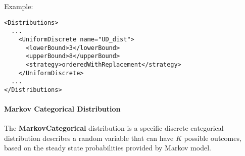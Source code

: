 Example:
\begin{lstlisting}[style=XML]
<Distributions>
  ...
    <UniformDiscrete name="UD_dist">
      <lowerBound>3</lowerBound>
      <upperBound>8</upperBound>
      <strategy>orderedWithReplacement</strategy>
    </UniformDiscrete>
  ...
</Distributions>
\end{lstlisting}

\paragraph{Markov Categorical Distribution}
\label{subsec:markovCategorical}

The \textbf{MarkovCategorical} distribution is a specific discrete categorical distribution describes
a random variable that can have $K$ possible outcomes, based on the steady state probabilities provided by
Markov model.
%
